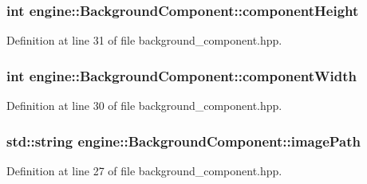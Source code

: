 \subsubsection[{\texorpdfstring{component\+Height}{componentHeight}}]{\setlength{\rightskip}{0pt plus 5cm}int engine\+::\+Background\+Component\+::component\+Height\hspace{0.3cm}{\ttfamily [protected]}}\hypertarget{classengine_1_1_background_component_af3aa1860b46dc7d4d1252c2a62d03f24}{}\label{classengine_1_1_background_component_af3aa1860b46dc7d4d1252c2a62d03f24}


Definition at line 31 of file background\+\_\+component.\+hpp.

\subsubsection[{\texorpdfstring{component\+Width}{componentWidth}}]{\setlength{\rightskip}{0pt plus 5cm}int engine\+::\+Background\+Component\+::component\+Width\hspace{0.3cm}{\ttfamily [protected]}}\hypertarget{classengine_1_1_background_component_ab791d4b2d6c30affd8d27bbd2f51db69}{}\label{classengine_1_1_background_component_ab791d4b2d6c30affd8d27bbd2f51db69}


Definition at line 30 of file background\+\_\+component.\+hpp.

\subsubsection[{\texorpdfstring{image\+Path}{imagePath}}]{\setlength{\rightskip}{0pt plus 5cm}std\+::string engine\+::\+Background\+Component\+::image\+Path\hspace{0.3cm}{\ttfamily [protected]}}\hypertarget{classengine_1_1_background_component_aeffcb1aa8b67444e004413dee8c266b1}{}\label{classengine_1_1_background_component_aeffcb1aa8b67444e004413dee8c266b1}


Definition at line 27 of file background\+\_\+component.\+hpp.

